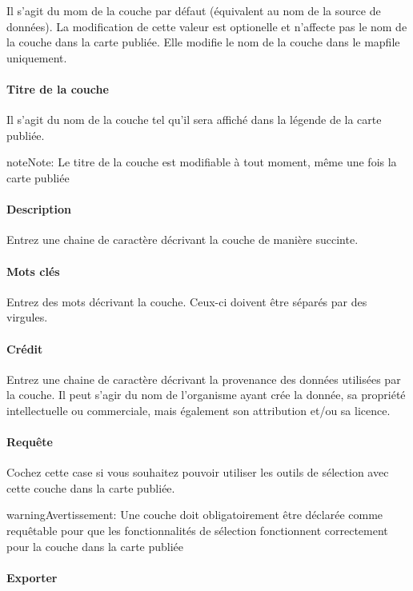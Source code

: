\documentclass[letterpaper,10pt,french]{sphinxmanual}
\begin{document}
Il s'agit du mom de la couche par défaut (équivalent au nom de la source de données). La modification de cette valeur est optionelle et n'affecte pas le nom de la couche dans la carte publiée. Elle modifie le nom de la couche dans le mapfile uniquement.
\paragraph{Titre de la couche}

Il s'agit du nom de la couche tel qu'il sera affiché dans la légende de la carte publiée.

\begin{notice}{note}{Note:}
Le titre de la couche est modifiable à tout moment, même une fois la carte publiée
\end{notice}
\paragraph{Description}

Entrez une chaine de caractère décrivant la couche de manière succinte.
\paragraph{Mots clés}

Entrez des mots décrivant la couche. Ceux-ci doivent être séparés par des virgules.
\paragraph{Crédit}

Entrez une chaine de caractère décrivant la provenance des données utilisées par la couche. Il peut s'agir du nom de l'organisme ayant crée la donnée, sa propriété intellectuelle ou commerciale, mais également son attribution et/ou sa licence.
\paragraph{Requête}

Cochez cette case si vous souhaitez pouvoir utiliser les outils de
sélection avec cette couche dans la carte publiée.

\begin{notice}{warning}{Avertissement:}
Une couche doit obligatoirement être déclarée comme requêtable
pour que les fonctionnalités de sélection fonctionnent
correctement pour la couche dans la carte publiée
\end{notice}
\paragraph{Exporter}
\end{document}
